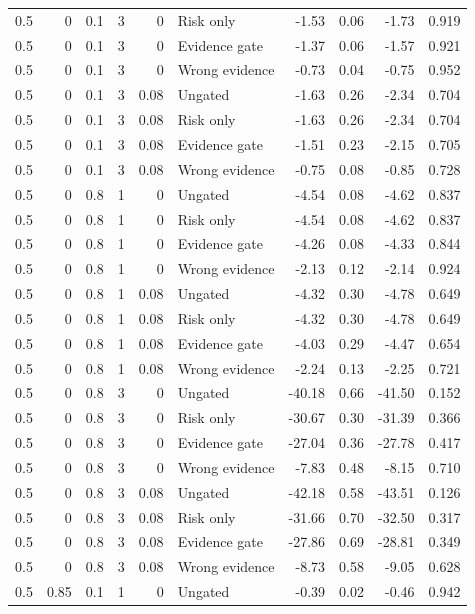 \begin{longtable}{rrrrrlrrrr}
0.5 & 0 & 0.1 & 3 & 0 & Risk only & -1.53 & 0.06 & -1.73 & 0.919\\
0.5 & 0 & 0.1 & 3 & 0 & Evidence gate & -1.37 & 0.06 & -1.57 & 0.921\\
0.5 & 0 & 0.1 & 3 & 0 & Wrong evidence & -0.73 & 0.04 & -0.75 & 0.952\\
0.5 & 0 & 0.1 & 3 & 0.08 & Ungated & -1.63 & 0.26 & -2.34 & 0.704\\
0.5 & 0 & 0.1 & 3 & 0.08 & Risk only & -1.63 & 0.26 & -2.34 & 0.704\\
0.5 & 0 & 0.1 & 3 & 0.08 & Evidence gate & -1.51 & 0.23 & -2.15 & 0.705\\
0.5 & 0 & 0.1 & 3 & 0.08 & Wrong evidence & -0.75 & 0.08 & -0.85 & 0.728\\
0.5 & 0 & 0.8 & 1 & 0 & Ungated & -4.54 & 0.08 & -4.62 & 0.837\\
0.5 & 0 & 0.8 & 1 & 0 & Risk only & -4.54 & 0.08 & -4.62 & 0.837\\
0.5 & 0 & 0.8 & 1 & 0 & Evidence gate & -4.26 & 0.08 & -4.33 & 0.844\\
0.5 & 0 & 0.8 & 1 & 0 & Wrong evidence & -2.13 & 0.12 & -2.14 & 0.924\\
0.5 & 0 & 0.8 & 1 & 0.08 & Ungated & -4.32 & 0.30 & -4.78 & 0.649\\
0.5 & 0 & 0.8 & 1 & 0.08 & Risk only & -4.32 & 0.30 & -4.78 & 0.649\\
0.5 & 0 & 0.8 & 1 & 0.08 & Evidence gate & -4.03 & 0.29 & -4.47 & 0.654\\
0.5 & 0 & 0.8 & 1 & 0.08 & Wrong evidence & -2.24 & 0.13 & -2.25 & 0.721\\
0.5 & 0 & 0.8 & 3 & 0 & Ungated & -40.18 & 0.66 & -41.50 & 0.152\\
0.5 & 0 & 0.8 & 3 & 0 & Risk only & -30.67 & 0.30 & -31.39 & 0.366\\
0.5 & 0 & 0.8 & 3 & 0 & Evidence gate & -27.04 & 0.36 & -27.78 & 0.417\\
0.5 & 0 & 0.8 & 3 & 0 & Wrong evidence & -7.83 & 0.48 & -8.15 & 0.710\\
0.5 & 0 & 0.8 & 3 & 0.08 & Ungated & -42.18 & 0.58 & -43.51 & 0.126\\
0.5 & 0 & 0.8 & 3 & 0.08 & Risk only & -31.66 & 0.70 & -32.50 & 0.317\\
0.5 & 0 & 0.8 & 3 & 0.08 & Evidence gate & -27.86 & 0.69 & -28.81 & 0.349\\
0.5 & 0 & 0.8 & 3 & 0.08 & Wrong evidence & -8.73 & 0.58 & -9.05 & 0.628\\
0.5 & 0.85 & 0.1 & 1 & 0 & Ungated & -0.39 & 0.02 & -0.46 & 0.942\\

\end{longtable}
